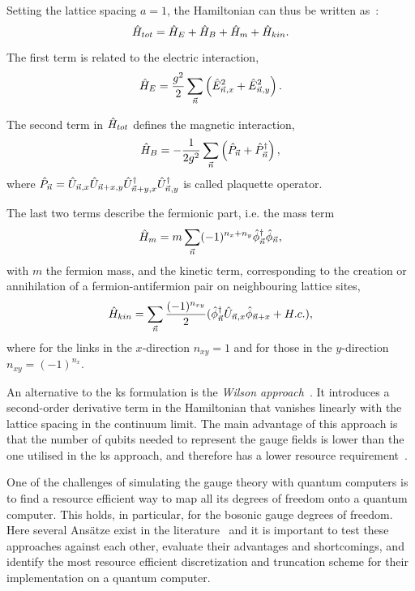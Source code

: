 Setting the lattice spacing $a=1$, the Hamiltonian can thus be written as~\cite{PhysRevD.16.3031}:
\begin{equation}\label{eq:fullH}
\hat{H}_{tot} = \hat{H}_E + \hat{H}_B + \hat{H}_m + \hat{H}_{kin}.
\end{equation}

The first term is related to the electric interaction,
\begin{eqnarray}
	\hat{H}_E = \frac{g^{2}}{2} \sum_{\vec{n}}\left(\hat{E}^{2}_{\vec{n}, x} 
	+ \hat{E}^{2}_{\vec{n}, y}\right).
\end{eqnarray}

The second term in $\hat{H}_{tot}$ defines the magnetic interaction,
\begin{eqnarray}
\hat{H}_B = -\frac{1}{2g^{2}} \sum_{\vec{n}} \left(\hat{P}_{\vec{n}} + \hat{P}_{\vec{n}}^{\dag}
\right),
\end{eqnarray}
where $\hat{P}_{\vec{n}} =  \hat{U}_{\vec{n},x}\hat{U}_{\vec{n}+x,y}\hat{U}^{\dag}_{\vec{n}+y,x}\hat{U}^{\dag}_{\vec{n},y}$ is called plaquette operator.

The last two terms describe the fermionic part, i.e. the mass term 
\begin{eqnarray}
\hat{H}_{m} = m \sum_{\vec{n}} (-1)^{n_x+n_y} \hat{\phi}^\dag_{\vec{n}} \hat{\phi}_{\vec{n}},
\end{eqnarray}
with $m$ the fermion mass, and the kinetic term, corresponding to the creation or annihilation of a fermion-antifermion pair on neighbouring lattice sites,
\begin{eqnarray}
\hat{H}_{kin} = \sum_{\vec{n}} 
\frac{(-1)^{n_{xy}}}{2} (\hat{\phi}_{\vec{n}}^{\dag} \hat{U}_{\vec{n},
 x} \hat{\phi}_{\vec{n}+ x} + {H.c.}),
\end{eqnarray}
where  for the links in the $x$-direction $n_{xy}=1$ and for those in the $y$-direction $n_{xy}=(-1)^{n_{x}}$.

An alternative to the \gls{ks} formulation is the \textit{Wilson approach}~\cite{PhysRevD.10.2445,angelides2023computing}. It introduces a second-order derivative term in the Hamiltonian that vanishes linearly with the lattice spacing in the continuum limit.
The main advantage of this approach is that the number of qubits needed to represent the gauge fields is lower than the one utilised in the \gls{ks} approach, and therefore has a lower resource requirement~\cite{Mathis2020}.


One of the challenges of simulating the gauge theory with quantum computers is to find a resource efficient way to map all its degrees of freedom onto a quantum computer. This holds, in particular, for the bosonic gauge degrees of freedom. Here several Ans\"atze exist in the 
literature~\cite{Clemente2022a,Bauer:2021gek,Haase2021resourceefficient,Kane:2022ejm} and it is important to test these approaches against each other, evaluate their advantages and shortcomings, and identify the most resource efficient discretization and truncation scheme for their implementation on a quantum computer.  

